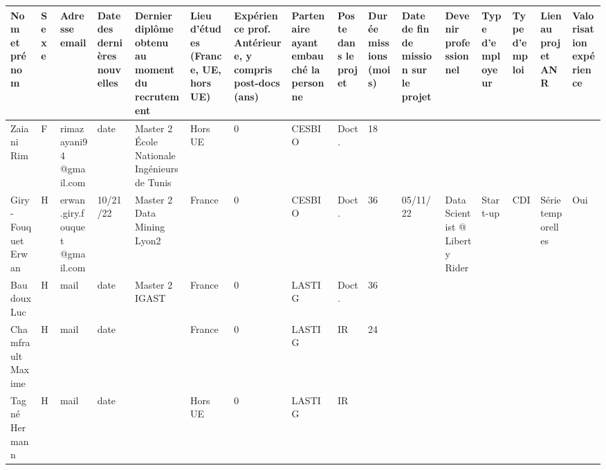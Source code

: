 

\begin{sidewaystable}[htbp]
\tiny
    \centering
    \begin{tabular}{|m{1.85cm}|m{0.35cm}|m{1.25cm}|m{1.15cm}|m{1.25cm}|m{1.25cm}|m{1.25cm}|m{}|m{}|m{}|m{}|m{}|m{}|m{}|m{1cm}|m{1cm}|}
    \hline
Nom et prénom & Sexe& Adresse email & Date des dernières nouvelles
 & Dernier diplôme obtenu au moment du recrutement  & 
Lieu d'études (France, UE, hors UE)  & 
Expérience prof. Antérieure, y compris post-docs (ans)  & 
Partenaire ayant embauché la personne  & 
Poste dans le projet  & 
Durée  missions (mois)  & 
Date de fin de mission sur le projet & 
Devenir professionnel & 
Type d’employeur & 
Type d’emploi  & 
Lien au projet ANR & 
Valorisation expérience \\\hline

Zaiani Rim&F&rimazayani94 @gmail.com&date&Master 2 École Nationale Ingénieurs de Tunis&Hors UE&0&CESBIO&Doct.&18&&&&&&\\\hline
Giry-Fouquet Erwan&H& erwan.giry.fouquet @gmail.com&10/21/22&Master 2 Data Mining Lyon2&France&0&CESBIO&Doct.&36& 05/11/22&  Data Scientist @ Liberty Rider &Start-up&CDI&Série temporelles&Oui\\\hline
Baudoux Luc&H&mail&date&Master 2 IGAST&France&0&LASTIG&Doct.&36&&&&&&\\\hline
Chamfrault Maxime&H&mail&date&&France&0&LASTIG&IR&24&&&&&&\\\hline
Tagné Hermann&H&mail&date&&Hors UE&0&LASTIG&IR&&&&&&&\\

      \hline
    \end{tabular}
    \label{tab:people}
\end{sidewaystable}


